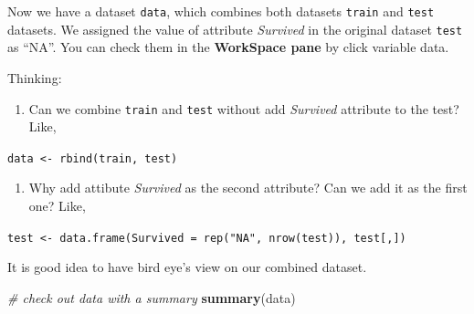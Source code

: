 \documentclass[
]{book}
\newenvironment{Shaded}{\begin{snugshade}}{\end{snugshade}}
\newcommand{\CommentTok}[1]{\textcolor[rgb]{0.56,0.35,0.01}{\textit{#1}}}
\newcommand{\KeywordTok}[1]{\textcolor[rgb]{0.13,0.29,0.53}{\textbf{#1}}}
\newcommand{\NormalTok}[1]{#1}
\providecommand{\tightlist}{%
  \setlength{\itemsep}{0pt}\setlength{\parskip}{0pt}}
\begin{document}
Now we have a dataset \texttt{data}, which combines both datasets \texttt{train} and \texttt{test} datasets. We assigned the value of attribute \emph{Survived} in the original dataset \texttt{test} as ``NA''. You can check them in the \textbf{WorkSpace pane} by click variable data.

\begin{rmdtry}
Thinking:

\begin{enumerate}
\def\labelenumi{\arabic{enumi}.}
\tightlist
\item
  Can we combine \texttt{train} and \texttt{test} without add \emph{Survived} attribute to the test? Like,
\end{enumerate}

\texttt{data\ \textless{}-\ rbind(train,\ test)}

\begin{enumerate}
\def\labelenumi{\arabic{enumi}.}
\setcounter{enumi}{1}
\tightlist
\item
  Why add attibute \emph{Survived} as the second attribute? Can we add it as the first one? Like,
\end{enumerate}

\texttt{test\ \textless{}-\ data.frame(Survived\ =\ rep("NA",\ nrow(test)),\ test{[},{]})}
\end{rmdtry}

It is good idea to have bird eye's view on our combined dataset.

\begin{Shaded}
\begin{Highlighting}[]
\CommentTok{# check out data with a summary}
\KeywordTok{summary}\NormalTok{(data)}
\end{Highlighting}
\end{Shaded}
\end{document}
